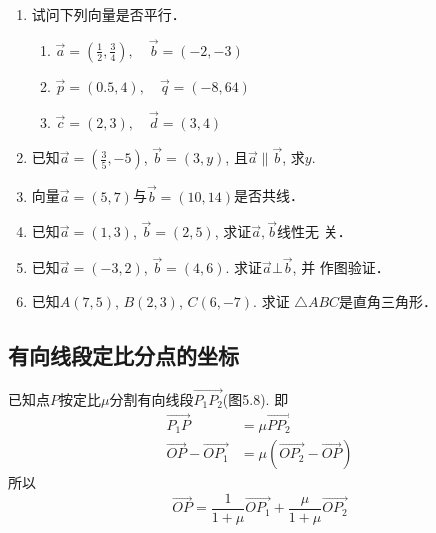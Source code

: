 \begin{ex}
\begin{enumerate}
    \item 试问下列向量是否平行．
    \begin{enumerate}
    \item $\vec{a}=\left(\frac{1}{2},\frac{3}{4}\right),\quad \vec{b}=(-2,-3)$
    \item $\vec{p}=(0.5,4),\quad \vec{q}=(-8,64)$
    \item $\vec{c}=(2,3),\quad \vec{d}=(3,4)$
\end{enumerate}

\item 已知$\vec{a}=\left(\frac{3}{5},-5\right)$, $\vec{b}=(3,y)$, 且$\vec{a}\parallel \vec{b}$, 求$y$.

\item 向量$\vec{a}=(5,7)$与$\vec{b}=(10,14)$是否共线．

\item 已知$\vec{a}=(1,3)$, $\vec{b}=(2,5)$, 求证$\vec{a},\vec{b}$线性无
关．

\item 已知$\vec{a}=(-3,2)$, $\vec{b}=(4,6)$. 求证$\vec{a}\bot \vec{b}$, 并
作图验证．

\item 已知$A(7,5)$, $B(2,3)$, $C(6,-7)$. 求证
$\triangle ABC$是直角三角形．
\end{enumerate}
\end{ex}

\subsection{有向线段定比分点的坐标}
已知点$P$按定比$\mu$分割有向线段$\Vec{P_1P_2}$(图5.8). 
即
\[\begin{split}
     \Vec{P_1P}&=\mu \Vec{PP_2}\\
     \Vec{OP}-\Vec{OP_1}&=\mu\left(\Vec{OP_2}-\Vec{OP}\right)
\end{split}\]
所以
\[\Vec{OP}=\frac{1}{1+\mu}\Vec{OP_1}+\frac{\mu}{1+\mu}\Vec{OP_2}\]

\begin{figure}[htp]
    \centering
{}
    \caption{}
\end{figure}


